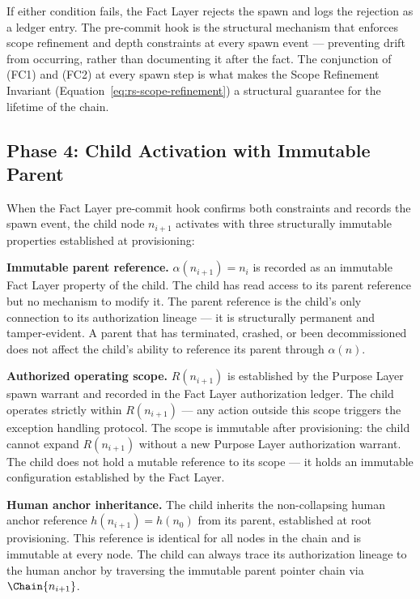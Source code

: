 If either condition fails, the Fact Layer rejects the spawn and logs the rejection as a ledger entry. The pre-commit hook is the structural mechanism that enforces scope refinement and depth constraints at every spawn event — preventing drift from occurring, rather than documenting it after the fact. The conjunction of (FC1) and (FC2) at every spawn step is what makes the Scope Refinement Invariant (Equation~\ref{eq:rs-scope-refinement}) a structural guarantee for the lifetime of the chain.

\subsection{Phase 4: Child Activation with Immutable Parent}
\label{sec:rs-phase4}

When the Fact Layer pre-commit hook confirms both constraints and records the spawn event, the child node $n_{i+1}$ activates with three structurally immutable properties established at provisioning:

\medskip
\noindent\textbf{Immutable parent reference.} $\alpha(n_{i+1}) = n_i$ is recorded as an immutable Fact Layer property of the child. The child has read access to its parent reference but no mechanism to modify it. The parent reference is the child's only connection to its authorization lineage — it is structurally permanent and tamper-evident. A parent that has terminated, crashed, or been decommissioned does not affect the child's ability to reference its parent through $\alpha(n)$.

\medskip
\noindent\textbf{Authorized operating scope.} $R(n_{i+1})$ is established by the Purpose Layer spawn warrant and recorded in the Fact Layer authorization ledger. The child operates strictly within $R(n_{i+1})$ — any action outside this scope triggers the exception handling protocol. The scope is immutable after provisioning: the child cannot expand $R(n_{i+1})$ without a new Purpose Layer authorization warrant. The child does not hold a mutable reference to its scope — it holds an immutable configuration established by the Fact Layer.

\medskip
\noindent\textbf{Human anchor inheritance.} The child inherits the non-collapsing human anchor reference $h(n_{i+1}) = h(n_0)$ from its parent, established at root provisioning. This reference is identical for all nodes in the chain and is immutable at every node. The child can always trace its authorization lineage to the human anchor by traversing the immutable parent pointer chain via $\Chain{n_{i+1}}$.

